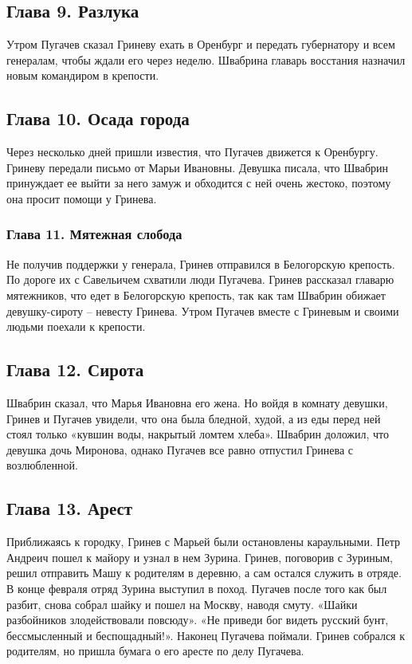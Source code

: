\documentclass[a4paper,12pt]{article}
\begin{document}
\subsection{Глава 9. Разлука}

Утром Пугачев сказал Гриневу ехать в Оренбург и передать губернатору и всем генералам, чтобы ждали его через неделю. Швабрина главарь восстания назначил новым командиром в крепости.

\subsection{Глава 10. Осада города}

Через несколько дней пришли известия, что Пугачев движется к Оренбургу. Гриневу передали письмо от Марьи Ивановны. Девушка писала, что Швабрин принуждает ее выйти за него замуж и обходится с ней очень жестоко, поэтому она просит помощи у Гринева.

\subsubsection{Глава 11. Мятежная слобода}

Не получив поддержки у генерала, Гринев отправился в Белогорскую крепость. По дороге их с Савельичем схватили люди Пугачева. Гринев рассказал главарю мятежников, что едет в Белогорскую крепость, так как там Швабрин обижает девушку-сироту – невесту Гринева. Утром Пугачев вместе с Гриневым и своими людьми поехали к крепости.

\subsection{Глава 12. Сирота}

Швабрин сказал, что Марья Ивановна его жена. Но войдя в комнату девушки, Гринев и Пугачев увидели, что она была бледной, худой, а из еды перед ней стоял только «кувшин воды, накрытый ломтем хлеба». Швабрин доложил, что девушка дочь Миронова, однако Пугачев все равно отпустил Гринева с возлюбленной.

\subsection{Глава 13. Арест}

Приближаясь к городку, Гринев с Марьей были остановлены караульными. Петр Андреич пошел к майору и узнал в нем Зурина. Гринев, поговорив с Зуриным, решил отправить Машу к родителям в деревню, а сам остался служить в отряде.
В конце февраля отряд Зурина выступил в поход. Пугачев после того как был разбит, снова собрал шайку и пошел на Москву, наводя смуту. «Шайки разбойников злодействовали повсюду». «Не приведи бог видеть русский бунт, бессмысленный и беспощадный!».
Наконец Пугачева поймали. Гринев собрался к родителям, но пришла бумага о его аресте по делу Пугачева.
\end{document}
